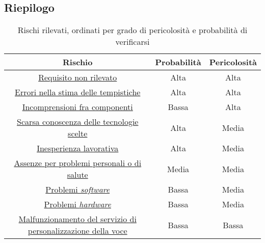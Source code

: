 
\subsection{Riepilogo}
\begin{table}[h]
\centering
\bgroup
\def\arraystretch{1.6}
\begin{tabular}{| c | c | c |}
\hline
\textbf{Rischio} & \textbf{Probabilità} & \textbf{Pericolosità}\\ \hline \hline 
\hyperref[sec:ReqNonRil]{Requisito non rilevato} & Alta & Alta \\ \hline
\hyperref[sec:ErrTemp]{Errori nella stima delle tempistiche} & Alta & Alta \\ \hline
\hyperref[sec:Incomp]{Incomprensioni fra componenti} & Bassa & Alta \\ \hline
\hyperref[sec:ScarsTec]{Scarsa conoscenza delle tecnologie scelte} & Alta & Media \\ \hline
\hyperref[sec:IneLav]{Inesperienza lavorativa} & Alta & Media \\ \hline
\hyperref[sec:Assenze]{Assenze per problemi personali o di salute} & Media & Media \\ \hline
\hyperref[sec:PSW]{Problemi \textit{software}} & Bassa & Media \\ \hline
\hyperref[sec:PHW]{Problemi \textit{hardware}} & Bassa & Media \\ \hline
\hyperref[sec:PMalf]{Malfunzionamento del servizio di personalizzazione della voce} & Bassa & Bassa \\ \hline
\end{tabular}
\egroup
\caption{Rischi rilevati, ordinati per grado di pericolosità e probabilità di verificarsi}
\end{table}


